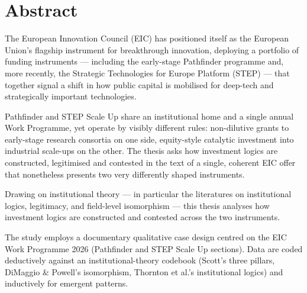 \section*{Abstract}

\noindent
The European Innovation Council (EIC) has positioned itself as the European
Union's flagship instrument for breakthrough innovation, deploying a portfolio
of funding instruments — including the early-stage Pathfinder programme and,
more recently, the Strategic Technologies for Europe Platform (STEP) — that
together signal a shift in how public capital is mobilised for deep-tech and
strategically important technologies.

Pathfinder and STEP Scale Up share an institutional home and a single annual
Work Programme, yet operate by visibly different rules: non-dilutive grants
to early-stage research consortia on one side, equity-style catalytic
investment into industrial scale-ups on the other. The thesis asks how
investment logics are constructed, legitimised and contested in the text of
a single, coherent EIC offer that nonetheless presents two very differently
shaped instruments.

Drawing on institutional theory — in particular the literatures on
institutional logics, legitimacy, and field-level isomorphism — this thesis
analyses how investment logics are constructed and contested across the two
instruments.

The study employs a documentary qualitative case design centred on the EIC
Work Programme 2026 (Pathfinder and STEP Scale Up sections). Data are coded
deductively against an institutional-theory codebook (Scott's three pillars,
DiMaggio \& Powell's isomorphism, Thornton et al.'s institutional logics) and
inductively for emergent patterns.

